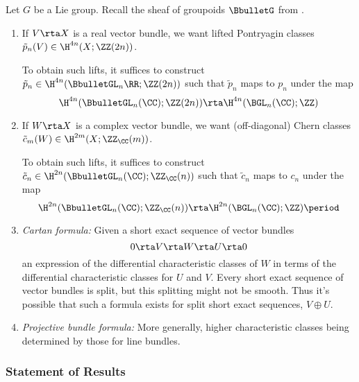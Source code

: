 Let $G$ be a Lie group. 
Recall the sheaf of groupoids $\BbulletG$ from .
\begin{enumerate}[(1)]
	\item If $V\rta X$ is a real vector bundle, we want lifted Pontryagin classes $\tilde{p}_n(V)\in \H^{4n}(X;\ZZ(2n))$. 

	\subitem To obtain such lifts, it suffices to construct $\tilde{p}_n\in \H^{4n}(\BbulletGL_n\RR;\ZZ(2n))$ such that $\tilde{p}_n$ maps to $p_n$ under the map
	\begin{equation*}
		\H^{4n}(\BbulletGL_n(\CC);\ZZ(2n))\rta \H^{4n}(\BGL_n(\CC);\ZZ)
	\end{equation*}

	\item If $W\rta X$ is a complex vector bundle, we want (off-diagonal) Chern classes $\tilde{c}_m(W)\in \H^{2m}(X;\ZZ_\CC(m))$. 

	\subitem To obtain such lifts, it suffices to construct $\tilde{c}_n\in \H^{2n}(\BbulletGL_n(\CC);\ZZ_\CC(n))$ such that $\tilde{c}_n$ maps to $c_n$ under the map
	\begin{equation*}
		\H^{2n}(\BbulletGL_n(\CC);\ZZ_\CC(n))\rta \H^{2n}(\BGL_n(\CC);\ZZ) \period
	\end{equation*}

	\item \textit{Cartan formula:} Given a short exact sequence of vector bundles
	\begin{equation*}
		0\rta V\rta W\rta U\rta 0
	\end{equation*}
	an expression of the differential characteristic classes of $W$ in terms of the differential characteristic classes for $U$ and $V$. Every short exact sequence of vector bundles is split, but this splitting might not be smooth. 
	Thus it's possible that such a formula exists for split short exact sequences, $V\oplus U$. %

	\item \textit{Projective bundle formula:} More generally, higher characteristic classes being determined by those for line bundles.
\end{enumerate}


\subsubsection{Statement of Results}

